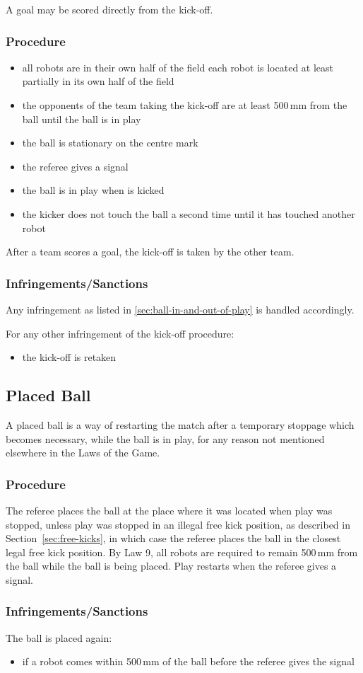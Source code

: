 A goal may be scored directly from the kick-off.

\subsubsection{Procedure}
\begin{itemize}
\item
all robots are in their own half of the field
each robot is located at least partially in its own half of the field
\item the opponents of the team taking the kick-off are at least 500\,mm from the ball until the ball is in play
\item the ball is stationary on the centre mark
\item the referee gives a signal
\item the ball is in play when is kicked 
\item the kicker does not touch the ball a second time until it has touched another robot
\end{itemize}

After a team scores a goal, the kick-off is taken by the other team.

\subsubsection{Infringements/Sanctions}
Any infringement as listed in \autoref{sec:ball-in-and-out-of-play} is handled accordingly.

For any other infringement of the kick-off procedure:
\begin{itemize}
\item the kick-off is retaken
\end{itemize}

\subsection{Placed Ball}
\label{sec:placedBall}
A placed ball is a way of restarting the match after a temporary stoppage which becomes necessary, while the ball is in play, for any reason not mentioned elsewhere in the Laws of the Game.

\subsubsection{Procedure}
The referee places the ball at the place where it was located when play was stopped, unless
play was stopped in an illegal free kick position, as described in Section~\ref{sec:free-kicks},
in which case the referee places the ball in the closest legal free kick position.
By Law 9, all robots are required to remain 500\,mm from the ball while the ball is being placed.
Play restarts when the referee gives a signal.

\subsubsection{Infringements/Sanctions}
The ball is placed again:
\begin{itemize}
\item if a robot comes within 500\,mm of the ball before the referee gives the signal
\end{itemize}
